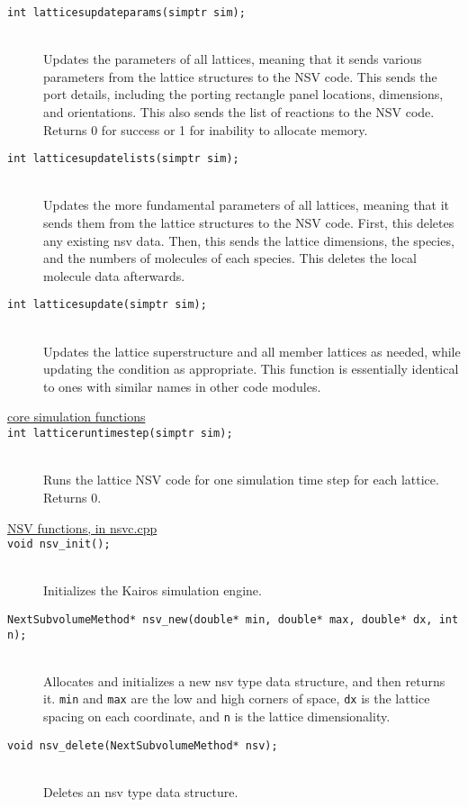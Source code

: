 \documentclass {book}
\newcommand {\ttt} {\texttt}
\begin{document}
\begin{description}
\item[\ttt{int latticesupdateparams(simptr sim);}]
\hfill \\
Updates the parameters of all lattices, meaning that it sends various parameters from the lattice structures to the NSV code. This sends the port details, including the porting rectangle panel locations, dimensions, and orientations. This also sends the list of reactions to the NSV code. Returns 0 for success or 1 for inability to allocate memory.

\item[\ttt{int latticesupdatelists(simptr sim);}]
\hfill \\
Updates the more fundamental parameters of all lattices, meaning that it sends them from the lattice structures to the NSV code. First, this deletes any existing nsv data. Then, this sends the lattice dimensions, the species, and the numbers of molecules of each species. This deletes the local molecule data afterwards.

\item[\ttt{int latticesupdate(simptr sim);}]
\hfill \\
Updates the lattice superstructure and all member lattices as needed, while updating the condition as appropriate. This function is essentially identical to ones with similar names in other code modules.

\item[\underline{core simulation functions}]

\item[\ttt{int latticeruntimestep(simptr sim);}]
\hfill \\
Runs the lattice NSV code for one simulation time step for each lattice. Returns 0.

\item[\underline{NSV functions, in nsvc.cpp}]

\item[\ttt{void nsv\_init();}]
\hfill \\
Initializes the Kairos simulation engine.

\item[\ttt{NextSubvolumeMethod* nsv\_new(double* min, double* max, double* dx, int n);}]
\hfill \\
Allocates and initializes a new nsv type data structure, and then returns it. \ttt{min} and \ttt{max} are the low and high corners of space, \ttt{dx} is the lattice spacing on each coordinate, and \ttt{n} is the lattice dimensionality.

\item[\ttt{void nsv\_delete(NextSubvolumeMethod* nsv);}]
\hfill \\
Deletes an nsv type data structure.


\end{description}
\end{document}
